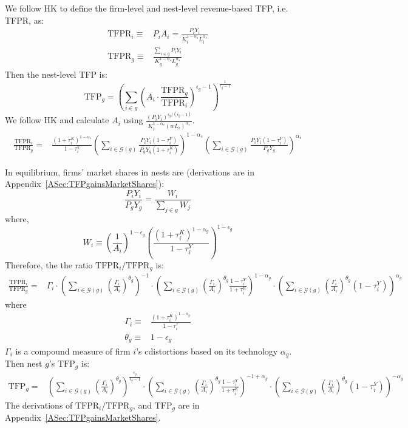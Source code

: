 \documentclass[12pt]{article}
\begin{document}
We follow HK to define the firm-level and nest-level revenue-based TFP, i.e. TFPR, as:
\begin{align*}
\text{TFPR}_{i} \equiv &  P_iA_i = \frac{P_{i}Y_{i}}{K_{i}^{1-\alpha_s}L_{i}^{\alpha_s}}\\
\text{TFPR}_{g} \equiv & \frac{\sum_{i\in g}P_{i}Y_{i}}{K_{g}^{1-\alpha_s}L_{g}^{\alpha_s}}
\end{align*}
Then the nest-level TFP is:
$$\text{TFP}_g=\left( \sum_{i \in g}\left( A_i \cdot \frac{\text{TFPR}_g}{\text{TFPR}_i} \right)^{\epsilon_g-1} \right)^{\frac{1}{\epsilon_g-1}}$$
We follow HK and calculate $A_i$ using $\frac{( P_{i}Y_{i} )^{\epsilon_g/(\epsilon_g-1)}}{K_{i}^{1-\alpha_s}(wL_{i})^{\alpha_s}}$. %
\begin{align*}
\frac{\text{TFPR}_i}{\text{TFPR}_g}=& \frac{(1+\tau_i^K)^{1-\alpha_s}}{1-\tau_i^Y} \left( \sum_{i \in \mathcal{G}(g)}\frac{P_iY_i(1-\tau_i^Y)}{P_gY_g(1+\tau_i^K)} \right)^{1-\alpha_s}\left( \sum_{i \in \mathcal{G}(g)}\frac{P_iY_i(1-\tau_i^Y)}{P_gY_g} \right)^{\alpha_s} 
\end{align*}

In equilibrium, firms' market shares in nests are (derivations are in Appendix~\ref{ASec:TFPgainsMarketShares}):
$$\frac{P_iY_i}{P_gY_g}=\frac{W_i}{\sum_{j\in g}W_j}$$
where,
$$W_i \equiv \left( \frac{1}{A_i}\right)^{1-\epsilon_g} \left( \frac{(1+\tau_i^K)^{1-\alpha_g}}{1-\tau_i^Y} \right)^{1-\epsilon_g}   $$ 
Therefore, the the ratio $\text{TFPR}_i/\text{TFPR}_g$ is:
\begin{align*}
\frac{\text{TFPR}_i}{\text{TFPR}_g}=&\Gamma_i \cdot \left( \sum_{i\in\mathcal{G}(g)} \left( \frac{\Gamma_i}{A_i} \right)^{\theta_g}\right)^{-1}\cdot \left( \sum_{i\in\mathcal{G}(g)} \left( \frac{\Gamma_i}{A_i} \right)^{\theta_g}\frac{1-\tau_i^Y}{1+\tau_i^K}\right)^{1-\alpha_g} \cdot \left( \sum_{i\in\mathcal{G}(g)} \left( \frac{\Gamma_i}{A_i} \right)^{\theta_g}(1-\tau_i^Y)\right)^{\alpha_g}
\end{align*}
where
\begin{align*}
\Gamma_i\equiv & \frac{(1+\tau_i^K)^{1-\alpha_g}}{1-\tau_i^Y} \\
\theta_g\equiv & 1-\epsilon_g
\end{align*}
$\Gamma_i$ is a compound measure of firm $i$'s cdistortions based on its technology $\alpha_g$. Then nest $g$'s $\text{TFP}_g$ is:
\begin{align*}
\text{TFP}_g=&\left( \sum_{i\in\mathcal{G}(g)}\left( \frac{\Gamma_i}{A_i} \right)^{\theta_g} \right)^{\frac{\epsilon_g}{\epsilon_g-1}} \cdot \left( \sum_{i\in\mathcal{G}(g)}\left( \frac{\Gamma_i}{A_i} \right)^{\theta_g} \frac{1-\tau_i^Y}{1+\tau_i^K}\right)^{-1+\alpha_g} \cdot \left( \sum_{i\in\mathcal{G}(g)}\left( \frac{\Gamma_i}{A_i} \right)^{\theta_g} (1-\tau_i^Y)\right)^{-\alpha_g} 
\end{align*}
The derivations of $\text{TFPR}_i/\text{TFPR}_g$, and $\text{TFP}_g$ are in Appendix~\ref{ASec:TFPgainsMarketShares}.
\end{document}
